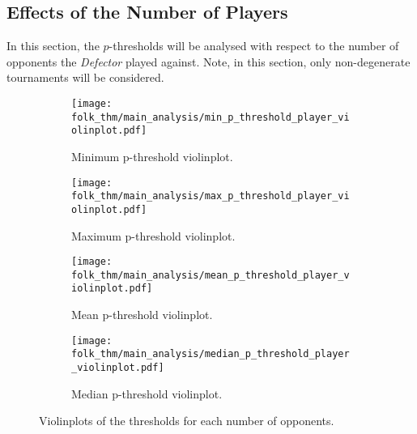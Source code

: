 \subsection{Effects of the Number of Players}\label{subsec:Effects_of_the_number_of_Players}
In this section, the \(p\)-thresholds will be analysed with respect to the
number of opponents the \textit{Defector} played against. Note, in this section,
only non-degenerate tournaments will be considered.


\begin{figure}
    \begin{subfigure}{0.45\textwidth}
        \centering
        \texttt{[image: folk\_thm/main\_analysis/min\_p\_threshold\_player\_violinplot.pdf]}
        \caption{Minimum p-threshold violinplot.}\label{subfig:min_thresh_player_violinplot}
    \end{subfigure}
    \begin{subfigure}{0.45\textwidth}
        \centering
        \texttt{[image: folk\_thm/main\_analysis/max\_p\_threshold\_player\_violinplot.pdf]}
        \caption{Maximum p-threshold violinplot.}\label{subfig:max_thresh_player_violinplot}
    \end{subfigure}

    \begin{subfigure}{0.45\textwidth}
        \centering
        \texttt{[image: folk\_thm/main\_analysis/mean\_p\_threshold\_player\_violinplot.pdf]}
        \caption{Mean p-threshold violinplot.}\label{subfig:mean_thresh_player_violinplot}        
    \end{subfigure}
    \begin{subfigure}{0.45\textwidth}
        \centering
        \texttt{[image: folk\_thm/main\_analysis/median\_p\_threshold\_player\_violinplot.pdf]}
        \caption{Median p-threshold violinplot.}\label{subfig:median_thresh_player_violinplot}
    \end{subfigure}
    \caption{Violinplots of the thresholds for each number of opponents.}\label{fig:player_mean_thresh_violinplot}
\end{figure}

